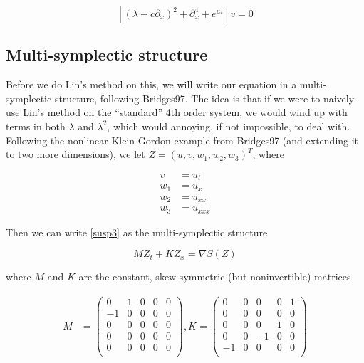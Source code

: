 \documentclass[12pt]{article}
\begin{document}
\begin{equation}\label{evp2}
[(\lambda - c \partial_x)^2 + \partial_x^4 + e^{u_*}]v = 0
\end{equation}

\subsection{Multi-symplectic structure}

Before we do Lin's method on this, we will write our equation in a multi-symplectic structure, following Bridges97. The idea is that if we were to naively use Lin's method on the ``standard'' 4th order system, we would wind up with terms in both $\lambda$ and $\lambda^2$, which would annoying, if not impossible, to deal with.\\

Following the nonlinear Klein-Gordon example from Bridges97 (and extending it to two more dimensions), we let $Z = (u, v, w_1, w_2, w_3)^T$, where 

\begin{align*}
v &= u_t \\
w_1 &= u_x \\
w_2 &= u_{xx} \\
w_3 &= u_{xxx}
\end{align*}

Then we can write \eqref{susp3} as the multi-symplectic structure

\[
M Z_t + K Z_x = \nabla S(Z)
\]

where $M$ and $K$ are the constant, skew-symmetric (but noninvertible) matrices

\begin{align*}
M &= \begin{pmatrix}
0 & 1 & 0 & 0 & 0 \\
-1 & 0 & 0 & 0 & 0 \\
0 & 0 & 0 & 0 & 0 \\
0 & 0 & 0 & 0 & 0 \\
0 & 0 & 0 & 0 & 0 \\
\end{pmatrix}, 
K = \begin{pmatrix}
0 & 0 & 0 & 0 & 1 \\
0 & 0 & 0 & 0 & 0 \\
0 & 0 & 0 & 1 & 0 \\
0 & 0 & -1 & 0 & 0 \\
-1 & 0 & 0 & 0 & 0 \\
\end{pmatrix}
\end{align*}
\end{document}
